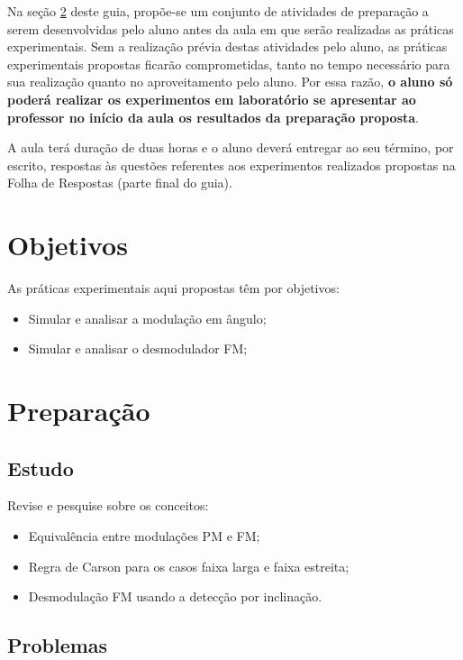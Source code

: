 \documentclass[12pt,addpoints]{exam}
\begin{document}
Na seção \ref{sect:Preparacao} deste guia, propõe-se um conjunto de atividades de preparação a serem desenvolvidas pelo aluno antes da aula em que serão realizadas as práticas experimentais. Sem a realização prévia destas atividades pelo aluno, as práticas experimentais propostas ficarão comprometidas, tanto no tempo necessário para sua realização quanto no aproveitamento pelo aluno. Por essa razão, \textbf{o aluno só poderá realizar os experimentos em laboratório se apresentar ao professor no início da aula os resultados da preparação proposta}. 

A aula terá duração de duas horas e o aluno deverá entregar ao seu término, por escrito, respostas às questões referentes aos experimentos realizados propostas na Folha de Respostas (parte final do guia).

\section{Objetivos}

As práticas experimentais aqui propostas têm por objetivos:
\begin{itemize}
    \item Simular e analisar a modulação em ângulo;
    \item Simular e analisar o desmodulador FM;
\end{itemize}

\section{Preparação} \label{sect:Preparacao}

\subsection{Estudo}

Revise e pesquise sobre os conceitos:
\begin{itemize}
    \item Equivalência entre modulações PM e FM;
    \item Regra de Carson para os casos faixa larga e faixa estreita;
    \item Desmodulação FM usando a detecção por inclinação.
\end{itemize}

\subsection{Problemas}
\end{document}
